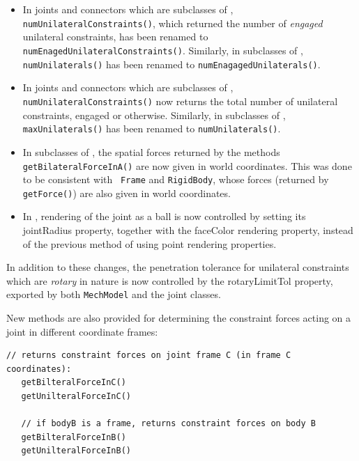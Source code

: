 \documentclass{article}
\begin{document}
\begin{itemize}

\item In joints and connectors which are subclasses of 
, {\tt
numUnilateralConstraints()}, which returned the number of {\it
engaged} unilateral constraints, has been renamed to {\tt
numEnagedUnilateralConstraints()}. Similarly, in subclasses of
, {\tt
numUnilaterals()} has been renamed to {\tt numEnagagedUnilaterals()}.

\item In joints and connectors which are subclasses of
, {\tt
numUnilateralConstraints()} now returns the total number of unilateral
constraints, engaged or otherwise.  Similarly, in subclasses of
, {\tt
maxUnilaterals()} has been renamed to {\tt numUnilaterals()}.

\item In subclasses of
, the spatial
forces returned by the methods {\tt getBilateralForceInA()} are now
given in world coordinates. This was done to be consistent with {\tt
Frame} and {\tt RigidBody}, whose forces (returned by {\tt getForce()})
are also given in world coordinates.

\item In ,
rendering of the joint as a ball is now controlled by setting its {\sf
jointRadius} property, together with the {\sf faceColor} rendering
property, instead of the previous method of using point rendering
properties.

\end{itemize}

In addition to these changes, the penetration tolerance for unilateral
constraints which are {\it rotary} in nature is now controlled by the
{\sf rotaryLimitTol} property, exported by both {\tt MechModel} and
the joint classes.

New methods are also provided for determining the constraint forces
acting on a joint in different coordinate frames:
%
\begin{lstlisting}[]
   // returns constraint forces on joint frame C (in frame C coordinates):
   getBilteralForceInC()
   getUnilteralForceInC()

   // if bodyB is a frame, returns constraint forces on body B
   getBilteralForceInB()
   getUnilteralForceInB()
\end{lstlisting}
%
\end{document}
